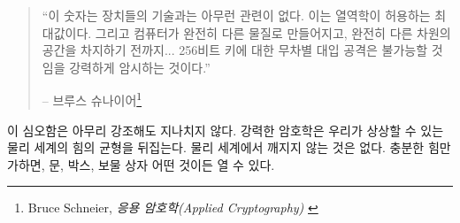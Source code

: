 \begin{comment}
	\begin{quotation}\begin{samepage}
			\enquote{These numbers have nothing to do with the technology of the devices;
				they are the maximums that thermodynamics will allow. And they
				strongly imply that brute-force attacks against 256-bit keys will be
				infeasible until computers are built from something other than matter
				and occupy something other than space.}
			\begin{flushright} -- Bruce Schneier\footnote{Bruce Schneier, \textit{Applied Cryptography} \cite{bruce-schneier}}
	\end{flushright}\end{samepage}\end{quotation}
\end{comment}
\begin{quotation}\begin{samepage}
		\enquote{이 숫자는 장치들의 기술과는 아무런 관련이 없다. 
			이는 열역학이 허용하는 최대값이다.
			그리고 컴퓨터가 완전히 다른 물질로 만들어지고, 완전히 다른 차원의 공간을 차지하기 전까지...
			256비트 키에 대한 무차별 대입 공격은 불가능할 것임을 강력하게 암시하는 것이다.}
		\begin{flushright} -- 브루스 슈나이어\footnote{Bruce Schneier, \textit{응용 암호학(Applied Cryptography)} \cite{bruce-schneier}}
\end{flushright}\end{samepage}\end{quotation}

\begin{comment}
	It is hard to overstate the profoundness of this. Strong cryptography
	inverts the power-balance of the physical world we are so used to.
	Unbreakable things do not exist in the real world. Apply enough force,
	and you will be able to open any door, box, or treasure chest.
\end{comment}
이 심오함은 아무리 강조해도 지나치지 않다.  
강력한 암호학은 우리가 상상할 수 있는 물리 세계의 힘의 균형을 뒤집는다. 
물리 세계에서 깨지지 않는 것은 없다. 충분한 힘만 가하면, 문, 박스, 보물 상자 어떤 것이든 열 수 있다.


